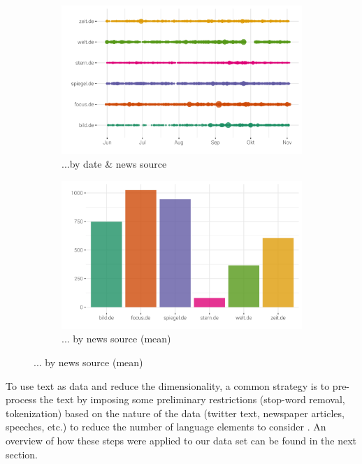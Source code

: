 \documentclass[12pt,a4paper,notitlepage]{article}
\begin{document}
\begin{figure}[H]
	\caption{Distribution of Facebook shares...}
	\begin{center}
		\begin{subfigure}[normla]{0.49\textwidth}
			\includegraphics[width=\textwidth]{../figs/fb_shares.png}
			\caption{...by date \& news source}
		\end{subfigure}
		\begin{subfigure}[normla]{0.49\textwidth}
			\includegraphics[width=\textwidth]{../figs/fb_shares_mean.png}
			\caption{... by news source (mean)}
		\end{subfigure}
	\end{center}
	\label{fig_fb_shares}
\end{figure}

To use text as data and reduce the dimensionality, a common strategy is to pre-process the text by imposing some preliminary restrictions (stop-word removal, tokenization) based on the nature of the data (twitter text, newspaper articles, speeches, etc.) to reduce the number of language elements to consider \citep{gentzkow_text_2017}. An overview of how these steps were applied to our data set can be found in the next section. 
\end{document}
